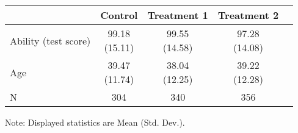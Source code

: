 \renewcommand\cellalign{t}
\begin{threeparttable}
\begin{tabular}{lcccc}
\toprule
 & Control & Treatment 1 & Treatment 2 \\
\midrule
\addlinespace
Ability (test score) & \makecell{99.18\\(15.11)} & \makecell{99.55\\(14.58)} & \makecell{97.28\\(14.08)} \\
Age & \makecell{39.47\\(11.74)} & \makecell{38.04\\(12.25)} & \makecell{39.22\\(12.28)} \\
\midrule
\addlinespace
N & 304 & 340 & 356 \\
\bottomrule
\end{tabular}
\footnotesize Note: Displayed statistics are Mean (Std. Dev.).
\end{threeparttable}